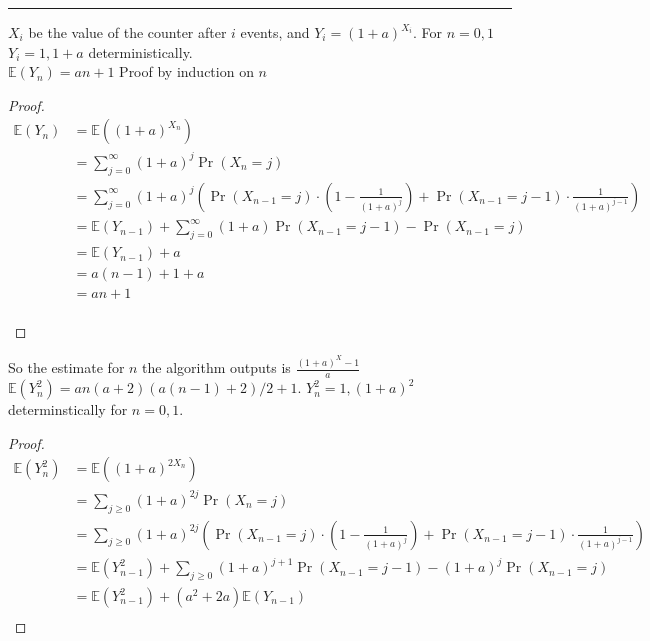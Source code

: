 \documentclass[11pt]{article}
\begin{document}




\begin{quote}

\end{quote}
\hrule
\begin{solution}
    \itemLet $X_i$ be the value of the counter after $i$ events, and $Y_i = (1 + a)^{X_i}$. For $n = 0, 1$ $Y_i = 1, 1 + a$ deterministically. \\
    $\mathbb{E}(Y_n) = an + 1$ Proof by induction on $n$
\begin{proof}
\begin{align*}
\mathbb{E}(Y_n) &= \mathbb{E}((1+a)^{X_n}) \\
&= \sum_{j = 0}^{\infty}(1+a)^j \Pr(X_n = j) \\
&= \sum_{j = 0}^{\infty}(1+a)^j (\Pr(X_{n-1} = j) \cdot (1 - \frac{1}{(1+a)^j}) + \Pr(X_{n-1} = j - 1) \cdot \frac{1}{(1+a)^{j-1}}) \\
&= \mathbb{E}(Y_{n-1}) + \sum_{j = 0}^{\infty}(1+a)\Pr(X_{n-1} = j - 1) - \Pr(X_{n-1} = j) \\
&= \mathbb{E}(Y_{n-1}) + a \\
&= a(n-1) + 1 + a \tag{By induction} \\
&= an + 1
\end{align*} \\\end{proof}
So the estimate for $n$ the algorithm outputs is $\frac{(1 + a)^X - 1}{a}$ \\
$\mathbb{E}(Y_n^2) = an(a + 2)(a(n-1) + 2)/2 + 1$. $Y_n^2 = 1, (1+a)^2$ determinstically for $n = 0, 1$. 
\begin{proof}
\begin{align*}
\mathbb{E}(Y_n^2) &= \mathbb{E}((1+a)^{2X_n}) \\
&= \sum_{j \geq 0} (1+a)^{2j}\Pr(X_n = j) \\
&=  \sum_{j \geq 0}(1+a)^{2j} (\Pr(X_{n-1} = j) \cdot (1 - \frac{1}{(1+a)^j}) + \Pr(X_{n-1} = j - 1) \cdot \frac{1}{(1+a)^{j-1}}) \\
&= \mathbb{E}(Y_{n-1}^2) + \sum_{j \geq 0}(1+a)^{j+1}\Pr(X_{n-1} = j-1) - (1+a)^j\Pr(X_{n-1} = j) \\
&= \mathbb{E}(Y_{n-1}^2) + (a^2 + 2a)\mathbb{E}(Y_{n-1}) \\

\end{align*}
\end{proof}
\end{solution}
\end{document}
